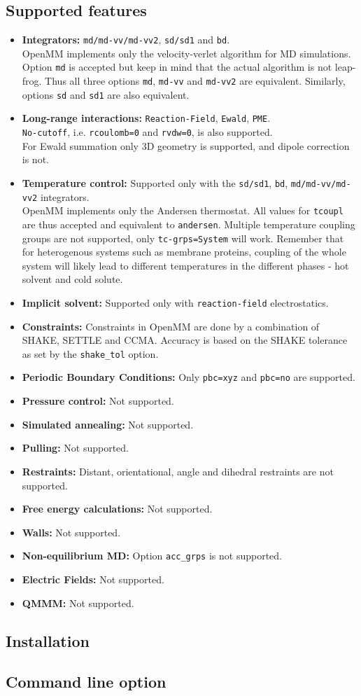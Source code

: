 \subsection{Supported features}

\begin{itemize}
\item \textbf{Integrators:} {\tt md/md-vv/md-vv2}, {\tt sd/sd1} and {\tt bd}.\\
OpenMM implements only the velocity-verlet algorithm for MD simulations.
Option {\tt md} is accepted but keep in mind that the actual algorithm is not leap-frog.
Thus all three options {\tt md}, {\tt md-vv} and {\tt md-vv2} are equivalent.
Similarly, options {\tt sd} and {\tt sd1} are also equivalent.
\item \textbf{Long-range interactions:} {\tt Reaction-Field}, {\tt Ewald}, {\tt PME}.\\
{\tt No-cutoff}, i.e. {\tt rcoulomb=0} and {\tt rvdw=0}, is also supported.\\
For Ewald summation only 3D geometry is supported, and dipole correction is not.
\item \textbf{Temperature control:} Supported only with the {\tt sd/sd1}, {\tt bd},
{\tt md/md-vv/md-vv2} integrators.\\
OpenMM implements only the Andersen thermostat. All values for {\tt tcoupl} are
thus accepted and equivalent to {\tt andersen}. Multiple temperature coupling groups
are not supported, only {\tt tc-grps=System} will work. Remember that for heterogenous
systems such as membrane proteins, coupling of the whole system will likely lead to
different temperatures in the different phases - hot solvent and cold solute.
\item \textbf{Implicit solvent:} Supported only with {\tt reaction-field} electrostatics.
\item \textbf{Constraints:} Constraints in OpenMM are done by a combination of SHAKE,
SETTLE and CCMA. Accuracy is based on the SHAKE tolerance as set by the {\tt shake\_tol} option.
\item \textbf{Periodic Boundary Conditions:} Only {\tt pbc=xyz} and {\tt pbc=no} are supported.
\item \textbf{Pressure control:} Not supported.
\item \textbf{Simulated annealing:} Not supported.
\item \textbf{Pulling:} Not supported.
\item \textbf{Restraints:} Distant, orientational, angle and dihedral restraints are not supported.
\item \textbf{Free energy calculations:} Not supported.
\item \textbf{Walls:} Not supported.
\item \textbf{Non-equilibrium MD:} Option {\tt acc\_grps} is not supported.
\item \textbf{Electric Fields:} Not supported.
\item \textbf{QMMM:} Not supported.
\end{itemize}

\subsection{Installation}


\subsection{Command line option}



